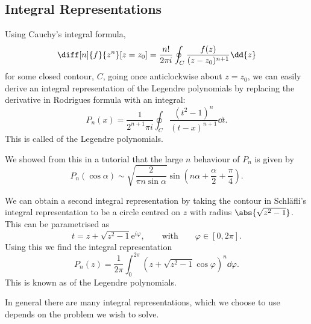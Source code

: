 \documentclass[fleqn]{NotesClass}
\newcommand*{\e}{\mathrm{e}}
\begin{document}
    \subsection{Integral Representations}
    Using Cauchy's integral formula,
    \begin{equation}
        \diff[n]{f}{z^n}[z=z_0] = \frac{n!}{2\pi i} \oint_C \frac{f(z)}{(z - z_0)^{n+1}} \dd{z}
    \end{equation}
    for some closed contour, \(C\), going once anticlockwise about \(z = z_0\), we can easily derive an integral representation of the Legendre polynomials by replacing the derivative in Rodrigues formula with an integral:
    \begin{equation}
        P_n(x) = \frac{1}{2^{n+1}\pi i} \oint_C \frac{(t^2 - 1)^n}{(t - x)^{n+1}} \dd{t}.
    \end{equation}
    This is called  of the Legendre polynomials.
    
    We showed from this in a tutorial that the large \(n\) behaviour of \(P_n\) is given by
    \begin{equation}
        P_n(\cos\alpha) \sim \sqrt{\frac{2}{\pi n\sin\alpha}} \sin\left( n\alpha + \frac{\alpha}{2} + \frac{\pi}{4} \right).
    \end{equation}
    
    We can obtain a second integral representation by taking the contour in Schl\"afli's integral representation to be a circle centred on \(z\) with radius \(\abs{\sqrt{z^2 - 1}}\).
    This can be parametrised as
    \begin{equation}
        t = z + \sqrt{z^2 - 1}\e^{i\varphi}, \qquad \text{with} \qquad \varphi \in [0, 2\pi].
    \end{equation}
    Using this we find the integral representation
    \begin{equation}
        P_n(z) = \frac{1}{2\pi} \int_{0}^{2\pi} (z + \sqrt{z^2 - 1}\cos\varphi)^n \dd{\varphi}.
    \end{equation}
    This is known as  of the Legendre polynomials.
    
    In general there are many integral representations, which we choose to use depends on the problem we wish to solve.
    
\end{document}
